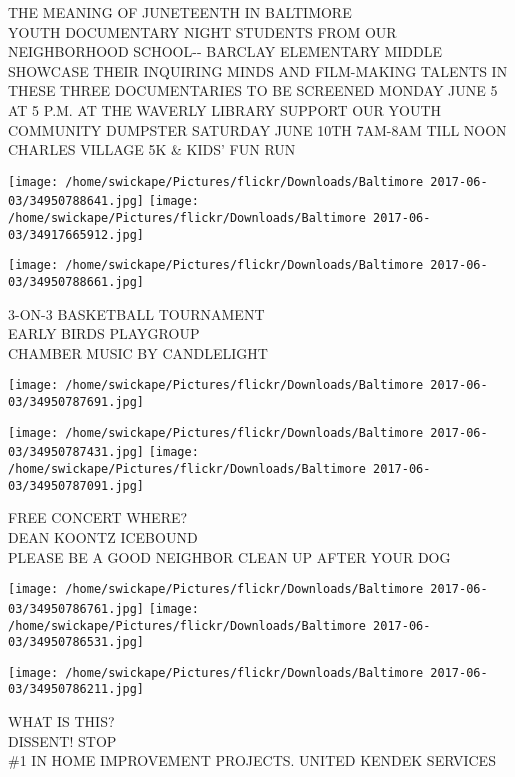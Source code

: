 \documentclass[10pt,letterpaper]{article}
\begin{document}
THE MEANING OF JUNETEENTH IN BALTIMORE\\
YOUTH DOCUMENTARY NIGHT STUDENTS FROM OUR NEIGHBORHOOD SCHOOL{-}{-} BARCLAY ELEMENTARY MIDDLE  SHOWCASE THEIR INQUIRING MINDS AND FILM{-}MAKING TALENTS IN THESE THREE DOCUMENTARIES TO BE SCREENED MONDAY JUNE 5 AT 5 P.M. AT THE WAVERLY LIBRARY SUPPORT OUR YOUTH\\
COMMUNITY DUMPSTER SATURDAY JUNE 10TH 7AM{-}8AM TILL NOON\\
CHARLES VILLAGE 5K \& KIDS' FUN RUN\\
\pagebreak

\texttt{[image: /home/swickape/Pictures/flickr/Downloads/Baltimore 2017-06-03/34950788641.jpg]}
\texttt{[image: /home/swickape/Pictures/flickr/Downloads/Baltimore 2017-06-03/34917665912.jpg]}

\texttt{[image: /home/swickape/Pictures/flickr/Downloads/Baltimore 2017-06-03/34950788661.jpg]}

3{-}ON{-}3 BASKETBALL TOURNAMENT\\
EARLY BIRDS PLAYGROUP\\
CHAMBER MUSIC BY CANDLELIGHT\\
\pagebreak

\texttt{[image: /home/swickape/Pictures/flickr/Downloads/Baltimore 2017-06-03/34950787691.jpg]}

\vspace{0.25in}
\texttt{[image: /home/swickape/Pictures/flickr/Downloads/Baltimore 2017-06-03/34950787431.jpg]}
\texttt{[image: /home/swickape/Pictures/flickr/Downloads/Baltimore 2017-06-03/34950787091.jpg]}

FREE CONCERT WHERE?\\
DEAN KOONTZ ICEBOUND\\
PLEASE BE A GOOD NEIGHBOR CLEAN UP AFTER YOUR DOG\\
\pagebreak

\texttt{[image: /home/swickape/Pictures/flickr/Downloads/Baltimore 2017-06-03/34950786761.jpg]}
\texttt{[image: /home/swickape/Pictures/flickr/Downloads/Baltimore 2017-06-03/34950786531.jpg]}

\texttt{[image: /home/swickape/Pictures/flickr/Downloads/Baltimore 2017-06-03/34950786211.jpg]}

WHAT IS THIS?\\
DISSENT! STOP\\
\#1 IN HOME IMPROVEMENT PROJECTS.  UNITED KENDEK SERVICES\\
\pagebreak
\end{document}
